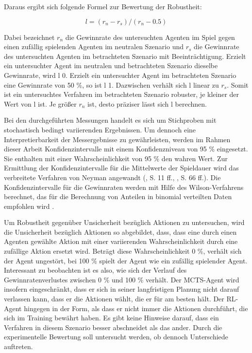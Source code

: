 Daraus ergibt sich folgende Formel zur Bewertung der Robustheit:

\[l = (r_n - r_s) / (r_n - 0.5)\]

Dabei bezeichnet $r_n$ die Gewinnrate des untersuchten Agenten im Spiel gegen einen zufällig spielenden Agenten im neutralen Szenario und $r_s$ die Gewinnrate des untersuchten Agenten im betrachteten Szenario mit Beeinträchtigung. Erzielt ein untersuchter Agent im neutralen und betrachteten Szenario dieselbe Gewinnrate, wird l 0. Erzielt ein untersuchter Agent im betrachteten Szenario eine Gewinnrate von 50 \%, so ist l 1. Dazwischen verhält sich l linear zu $r_s$. Somit ist ein untersuchtes Verfahren im betrachteten Szenario robuster, je kleiner der Wert von l ist. Je größer $r_n$ ist, desto präziser lässt sich l berechnen.

Bei den durchgeführten Messungen handelt es sich um Stichproben mit stochastisch bedingt variierenden Ergebnissen. Um dennoch eine Interpretierbarkeit der Messergebnisse zu gewährleisten, werden im Rahmen dieser Arbeit Konfidenzintervalle mit einem Konfidenzniveau von 95 \% eingesetzt. Sie enthalten mit einer Wahrscheinlichkeit von 95 \% den wahren Wert. Zur Ermittlung der Konfidenzintervalle für die Mittelwerte der Spieldauer wird das verbreitete Verfahren von Neyman angewandt (\cite{Frost.2023}, S. 11 ff., \cite{Janzyk.2020}, S. 66 ff.). Die Konfidenzintervalle für die Gewinnraten werden mit Hilfe des Wilson-Verfahrens berechnet, das für die Berechnung von Anteilen in binomial verteilten Daten empfohlen wird \cite{Wallis.2013} \cite{Lawrence.2001}.

Um Robustheit gegenüber Unsicherheit bezüglich Aktionen zu untersuchen, wird die Unsicherheit bezüglich Aktionen so abgebildet, dass, dass eine durch einen Agenten gewählte Aktion mit einer variierenden Wahrscheinlichkeit durch eine zufällige Aktion ersetzt wird. Beträgt diese Wahrscheinlichkeit 0 \%, verhält sich der Agent ungestört, bei 100 \% spielt der Agent wie ein zufällig spielender Agent. Interessant zu beobachten ist es also, wie sich der Verlauf des Gewinnratenverlustes zwischen 0 \% und 100 \% verhält. Der MCTS-Agent wird insofern eingeschränkt, dass er sich in seiner langfristigen Planung nicht darauf verlassen kann, dass er die Aktionen wählt, die er für am besten hält. Der RL-Agent hingegen in der Form, als dass er nicht immer die Aktionen durchführt, die sich im Training bewährt haben. Es gibt keine Hinweise darauf, dass ein Verfahren in diesem Szenario besser abschneidet als das ander. Durch die experimentelle Bewertung soll untersucht werden, ob dennoch Unterschiede auftreten.

